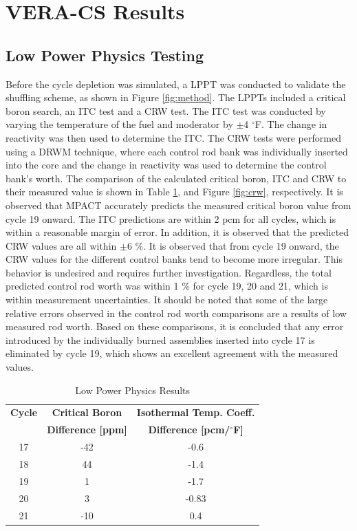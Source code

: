 \documentclass[edeposit,fullpage,11pt]{uiucthesis2009}
\begin{document}
\section{VERA-CS Results}

\subsection{Low Power Physics Testing}
Before the cycle depletion was simulated, a \gls{LPPT} was conducted to validate the shuffling scheme, as shown in Figure \ref{fig:method}.
The \gls{LPPT}s included a critical boron search, an \gls{ITC} test and a \gls{CRW} test. 
The \gls{ITC} test was conducted by varying the temperature of the fuel and moderator by $\pm$4 $^\circ$F. 
The change in reactivity was then used to determine the \gls{ITC}. 
The \gls{CRW} tests were performed using a \gls{DRWM} technique, where each control rod bank was individually inserted into the core and the change in reactivity was used to determine the control bank's worth. 
The comparison of the calculated critical boron, \gls{ITC} and \gls{CRW} to their measured value is shown in Table \ref{tab:cb}, and Figure \ref{fig:crw}, respectively. 
It is observed that MPACT accurately predicts the measured critical boron value from cycle 19 onward.
The \gls{ITC} predictions are within 2 pcm for all cycles, which is within a reasonable margin of error.
In addition, it is observed that the predicted \gls{CRW} values are all within $\pm6$ \%.
It is observed that from cycle 19 onward, the \gls{CRW} values for the different control banks tend to become more irregular.
This behavior is undesired and requires further investigation.
Regardless, the total predicted control rod worth was within 1 \% for cycle 19, 20 and 21, which is within measurement uncertainties. 
It should be noted that some of the large relative errors observed in the control rod worth comparisons are a results of low measured rod worth. 
Based on these comparisons, it is concluded that any error introduced by the individually burned assemblies inserted into cycle 17 is eliminated by cycle 19, which shows an excellent agreement with the measured values. 

\begin{table}
\caption{Low Power Physics Results}
\label{tab:cb}
\begin{center}
\begin{tabular}[!t]{ccc}
\textbf{Cycle}      & \textbf{Critical Boron}   & \textbf{Isothermal Temp. Coeff.}      \\
           & \textbf{Difference [ppm]} & \textbf{Difference [pcm/$^{\circ}$F]}  \\ 
17 & -42 & -0.6     \\
18 & 44  & -1.4     \\
19 & 1   & -1.7     \\
20 & 3   & -0.83    \\
21 & -10 &  0.4     \\
\end{tabular}
\end{center}
\end{table}
\end{document}
